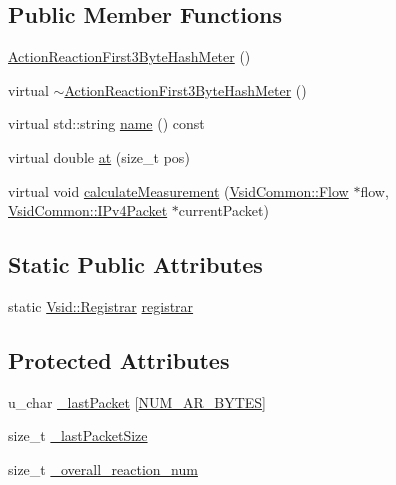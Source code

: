 \subsection*{Public Member Functions}
\begin{DoxyCompactItemize}
\item 
\hyperlink{class_vsid_1_1_action_reaction_first3_byte_hash_meter_a6e194e643bcacd0d59808a7fa184c782}{Action\-Reaction\-First3\-Byte\-Hash\-Meter} ()
\item 
virtual \hyperlink{class_vsid_1_1_action_reaction_first3_byte_hash_meter_a06a16492aa4d411ca5c0b352e3b1550c}{$\sim$\-Action\-Reaction\-First3\-Byte\-Hash\-Meter} ()
\item 
virtual std\-::string \hyperlink{class_vsid_1_1_action_reaction_first3_byte_hash_meter_a71143e12fa3872e47c84836bfe644b3c}{name} () const 
\item 
virtual double \hyperlink{class_vsid_1_1_action_reaction_first3_byte_hash_meter_ad66c1871306c2151b31518e167425697}{at} (size\-\_\-t pos)
\item 
virtual void \hyperlink{class_vsid_1_1_action_reaction_first3_byte_hash_meter_aa09c85dfa76ab2dcc0bc1e0a996e87f9}{calculate\-Measurement} (\hyperlink{class_vsid_common_1_1_flow}{Vsid\-Common\-::\-Flow} $\ast$flow, \hyperlink{class_vsid_common_1_1_i_pv4_packet}{Vsid\-Common\-::\-I\-Pv4\-Packet} $\ast$current\-Packet)
\end{DoxyCompactItemize}
\subsection*{Static Public Attributes}
\begin{DoxyCompactItemize}
\item 
static \hyperlink{class_vsid_1_1_registrar}{Vsid\-::\-Registrar} \hyperlink{class_vsid_1_1_action_reaction_first3_byte_hash_meter_adc746ce9d3f4f22d35331bc687a88483}{registrar}
\end{DoxyCompactItemize}
\subsection*{Protected Attributes}
\begin{DoxyCompactItemize}
\item 
u\-\_\-char \hyperlink{class_vsid_1_1_action_reaction_first3_byte_hash_meter_af21e55c2278704e0741e51829cfbee46}{\-\_\-last\-Packet} \mbox{[}\hyperlink{_action_reaction_first3_byte_hash_meter_8h_aea59a8fee574d94507bd2fd64f06acf6}{N\-U\-M\-\_\-\-A\-R\-\_\-\-B\-Y\-T\-E\-S}\mbox{]}
\item 
size\-\_\-t \hyperlink{class_vsid_1_1_action_reaction_first3_byte_hash_meter_ab48d56df173aa8838dafaa9cd24cd8a5}{\-\_\-last\-Packet\-Size}
\item 
size\-\_\-t \hyperlink{class_vsid_1_1_action_reaction_first3_byte_hash_meter_a396a0b8f344ca80365ddbca7d4e07889}{\-\_\-overall\-\_\-reaction\-\_\-num}
\end{DoxyCompactItemize}
